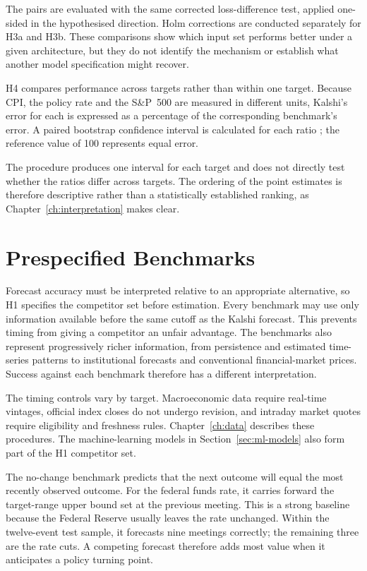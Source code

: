 \documentclass[12pt,a4paper]{report}
\begin{document}
The pairs are evaluated with the same corrected loss-difference test, applied
one-sided in the hypothesised direction. Holm corrections are conducted
separately for H3a and H3b. These comparisons show which input set performs
better under a given architecture, but they do not identify the mechanism or
establish what another model specification might recover.

H4 compares performance across targets rather than within one target. Because
CPI, the policy rate and the S\&P~500 are measured in different units, Kalshi's
error for each is expressed as a percentage of the corresponding benchmark's
error. A paired bootstrap confidence interval is calculated for each ratio
\parencite{efron1979}; the reference value of 100 represents equal error.

The procedure produces one interval for each target and does not directly test
whether the ratios differ across targets. The ordering of the point estimates
is therefore descriptive rather than a statistically established ranking, as
Chapter~\ref{ch:interpretation} makes clear.

\section{Prespecified Benchmarks}
\label{sec:benchmarks}

Forecast accuracy must be interpreted relative to an appropriate alternative,
so H1 specifies the competitor set before estimation. Every benchmark may use
only information available before the same cutoff as the Kalshi forecast. This
prevents timing from giving a competitor an unfair advantage. The benchmarks
also represent progressively richer information, from persistence and
estimated time-series patterns to institutional forecasts and conventional
financial-market prices. Success against each benchmark therefore has a
different interpretation.

The timing controls vary by target. Macroeconomic data require real-time
vintages, official index closes do not undergo revision, and intraday market
quotes require eligibility and freshness rules. Chapter~\ref{ch:data}
describes these procedures. The machine-learning models in
Section~\ref{sec:ml-models} also form part of the H1 competitor set.

The no-change benchmark predicts that the next outcome will equal the most
recently observed outcome. For the federal funds rate, it carries forward the
target-range upper bound set at the previous meeting. This is a strong baseline
because the Federal Reserve usually leaves the rate unchanged. Within the
twelve-event test sample, it forecasts nine meetings correctly; the remaining
three are the rate cuts. A competing forecast therefore adds most value when it
anticipates a policy turning point.
\end{document}
